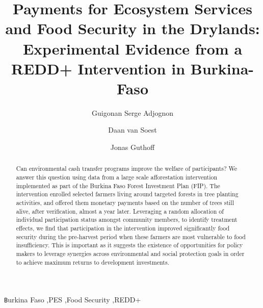 \documentclass[preprint,12pt]{elsarticle}
\begin{document}
\begin{frontmatter}

\title{Payments for Ecosystem Services and Food Security in the Drylands: Experimental Evidence from a REDD+ Intervention in Burkina-Faso}



\author[label1]{Guigonan Serge Adjognon}
\author[label2]{Daan van Soest}
\author[label1]{Jonas Guthoff}
\address[label1]{Development Impact Evaluation; The World Bank, Washington D.C., USA}
\address[label2]{Professor, Department of Economics, Tilburg University, Netherlands}




\begin{abstract}
Can environmental cash transfer programs improve the welfare of participants? We answer this question using data from a large scale afforestation intervention implemented as part of the Burkina Faso Forest Investment Plan (FIP). The intervention enrolled selected farmers living around targeted forests in tree planting activities, and offered them monetary payments based on the number of trees still alive, after verification, almost a year later. Leveraging a random allocation of individual participation status amongst community members, to identify treatment effects, we find that participation in the intervention improved significantly food security during the pre-harvest period when these farmers are most vulnerable to food insufficiency. This is important as it suggests the existence of opportunities for policy makers to leverage synergies across environmental and social protection goals in order to achieve maximum returns to development investments.


\end{abstract}

\begin{keyword}
\texttt Burkina Faso \sep PES \sep Food Security \sep REDD+
\end{keyword}

\end{frontmatter}
\end{document}
